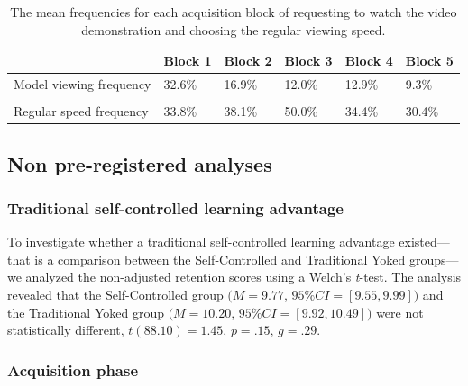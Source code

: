 \documentclass[
  english,
  jou]{apa7}
\begin{document}
\begin{table}[t]

\begin{center}
\begin{threeparttable}

\caption{\label{tab:table2}The mean frequencies for each acquisition block of requesting to watch the video demonstration and choosing the regular viewing speed.}

\begin{tabular}{llllll}
\toprule
  & Block 1 & Block 2 & Block 3 & Block 4 & Block 5\\
\midrule
Model viewing frequency & 32.6\% & 16.9\% & 12.0\% & 12.9\% & 9.3\%\\
 &  &  &  &  & \\
Regular speed frequency & 33.8\% & 38.1\% & 50.0\% & 34.4\% & 30.4\%\\
\bottomrule
\end{tabular}

\end{threeparttable}
\end{center}

\end{table}

\hypertarget{non-pre-registered-analyses}{%
\subsection{Non pre-registered analyses}\label{non-pre-registered-analyses}}

\hypertarget{traditional-self-controlled-learning-advantage}{%
\subsubsection{Traditional self-controlled learning advantage}\label{traditional-self-controlled-learning-advantage}}

To investigate whether a traditional self-controlled learning advantage existed---that is a comparison between the Self-Controlled and Traditional Yoked groups---we analyzed the non-adjusted retention scores using a Welch's \emph{t}-test. The analysis revealed that the Self-Controlled group \((M = 9.77\), \(95\%CI = [9.55,9.99])\) and the Traditional Yoked group \((M = 10.20\), \(95\%CI = [9.92,10.49])\) were not statistically different, \(t(88.10) = 1.45\), \(p = .15\), \(g = .29\).

\hypertarget{acquisition-phase}{%
\subsubsection{Acquisition phase}\label{acquisition-phase}}
\end{document}
